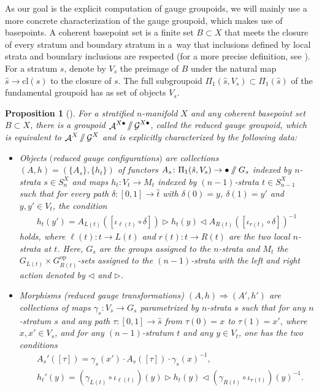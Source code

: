 \documentclass[pdftex]{sigma}
\DeclareMathOperator{\cala}{\mathcal{A}}
\DeclareMathOperator{\calg}{\mathcal{G}}
\newcommand{\sslash}{\mathbin{/\mkern-6mu/}}
\numberwithin{equation}{section}
\newtheorem{Proposition}[Proposition]{Proposition}
\theoremstyle{definition}
\begin{document}
As our goal is the explicit computation of gauge groupoids, we will mainly use a more concrete characterization of the gauge groupoid, which makes use of basepoints. A coherent basepoint set is a finite set $B \subset X$ that meets the closure of every stratum and boundary stratum in a~way that inclusions defined by local strata and boundary inclusions are respected (for a more precise definition, see \cite[Definition~5.14]{FMM}). For a stratum $s$, denote by $V_s$ the preimage of $B$ under the natural map $\hat{s} \rightarrow \mathrm{cl}(s)$ to the closure of $s$. The full subgroupoid $\Pi_1(\hat{s}, V_s) \subset \Pi_1(\hat{s})$ of the fundamental groupoid has as set of objects $V_s$.

\begin{Proposition}[{\cite[Corollary 5.18 and Proposition 5.19]{FMM}}]
 \label{propGG}
 For a stratified $n$-manifold $X$ and any coherent basepoint set $B \subset X$, there is a groupoid $\cala^{X \bullet} \sslash \calg^{X \bullet}$, called the \textit{reduced gauge groupoid}, which is equivalent to $\cala^X \sslash \calg^X$ and is explicitly characterized by the following data:
 \begin{itemize}\itemsep=0pt
 \item Objects $($\textnormal{reduced gauge configurations}$)$ are collections $(A, h) = (\{A_s\}, \{h_t\})$ of functors $A_s\colon \Pi_1(\hat{s}, V_s) \rightarrow \bullet \sslash G_s$ indexed by $n$-strata $s \in S_n^X$ and maps $h_t\colon V_t \rightarrow M_t$ indexed by $(n-1)$-strata $t \in S_{n-1}^X$ such that for every path $\delta\colon [0,1] \rightarrow \hat{t}$ with $\delta(0) = y$, $\delta(1) = y'$ and $y, y' \in V_t$, the condition
 \begin{align*}
 h_t(y') = A_{L(t)} ([ \iota_{\ell(t)} \circ \delta] ) \triangleright h_t(y) \triangleleft A_{R(t)} ([\iota_{r(t)} \circ \delta] )^{-1}
 \end{align*}
 holds, where $\ell(t)\colon t \rightarrow L(t)$ and $r(t)\colon t \rightarrow R(t)$ are the two local $n$-strata at $t$. Here, $G_s$ are the groups assigned to the $n$-strata and $M_t$ the $G_{L(t)} \times G_{R(t)}^{\mathrm{op}}$-sets assigned to the $(n-1)$-strata with the left and right action denoted by $\triangleleft$ and $\triangleright$.
 \item Morphisms (\textnormal{reduced gauge transformations}) $(A, h) \Rightarrow (A', h')$ are collections of maps $\gamma_s\colon V_s \rightarrow G_s$ parametrized by $n$-strata $s$ such that for any $n$-stratum $s$ and any path $\tau\colon [0,1] \rightarrow \hat{s}$ from $\tau(0) = x$ to $\tau(1) = x'$, where $x, x' \in V_s$, and for any $(n-1)$-stratum $t$ and any $y \in V_t$, one has the two conditions
 \begin{align*}
& A_s'([\tau])= \gamma_s(x') \cdot A_s([\tau]) \cdot \gamma_s(x)^{-1}, \\
&h_t'(y)= (\gamma_{L(t)} \circ \iota_{\ell(t)})(y) \triangleright h_t(y) \triangleleft (\gamma_{R(t)} \circ \iota_{r(t)})(y)^{-1}.
 \end{align*}
 \end{itemize}
\end{Proposition}
\end{document}
